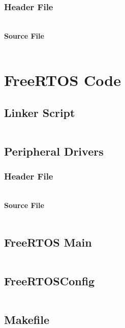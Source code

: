 	\subsection{Header File}
	\inputminted[breaklines]{c}{./appendices/files/S32K3x8_spi.h}
	\subsubsection{Source File}
	\inputminted[breaklines]{c}{./appendices/files/S32K3x8_spi.c}

\chapter{FreeRTOS Code}\label{FreeRTOS_code}

\section{Linker Script}\label{FreeRTOS_linker_script}
	\inputminted[breaklines]{c}{./appendices/files/S32K3.ld}
	
\section{Peripheral Drivers}\label{FreeRTOS_peripheral_drivers}
	\subsection{Header File}
	\inputminted[breaklines]{c}{./appendices/files/peripherals.h}
	\subsubsection{Source File}
	\inputminted[breaklines]{c}{./appendices/files/peripherals.c}

\section{FreeRTOS Main}\label{FreeRTOS_test_tasks}
	\inputminted[breaklines]{c}{./appendices/files/main.c}
\section{FreeRTOSConfig}\label{FreeRTOS_config}
	\inputminted[breaklines]{c}{./appendices/files/FreeRTOSConfig.h}

\section{Makefile}\label{Makefile}
	\inputminted[breaklines]{c}{./appendices/files/Makefile}
